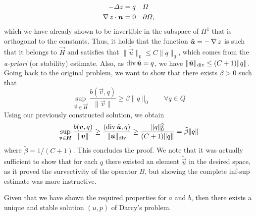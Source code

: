 \begin{itemize}
    \begin{equation}
        \begin{aligned}
            - \Delta z &= q && \Omega \\
            \grad z\cdot \vec n &= 0 &&\partial\Omega,
        \end{aligned}
    \end{equation}
    which we have already shown to be invertible in the subspace of $H^1$ that is orthogonal to the constants. Thus, it holds that the function $\tilde{\vec u} = -\grad z$ is such that it belongs to $\vec H$ and satisfies that $\|\tilde{\vec u}\|_0 \leq C \| q\|_0$, which comes from the \emph{a-priori} (or stability) estimate. Also, as $\dive \tilde{\vec u} = q$, we have $\|\tilde{\vec u}\|_{\dive} \leq (C+1)\|q\|$. Going back to the original problem, we want to show that there exists $\beta>0$ such that
    \begin{equation}
        \sup_{\vec v\in \vec H}\frac{b(\vec v, q)}{\|\vec v\|} \geq \beta \|q\|_0 \qquad \forall q \in Q
    \end{equation}
    Using our previously constructed solution, we obtain
    \begin{equation}
        \sup_{\vec v\in \vec H}\frac{b(\vec v, q)}{\|\vec v\|} \geq \frac{(\dive \tilde{\vec u}, q)}{\|\tilde{\vec u}\|_{\dive}}\geq \frac{\|q\|_0^2}{(C+1)\|q\|} = \tilde\beta \|q\|
    \end{equation}
    where $\tilde \beta = 1/(C+1)$. This concludes the proof. We note that it was actually sufficient to show that for each $q$ there existed an element $\tilde{\vec u}$ in the desired space, as it proved the survectivity of the operator $B$, but showing the complete inf-sup estimate was more instructive. 
\end{itemize}
Given that we have shown the required properties for $a$ and $b$, then there exists a unique and stable solution $(u,p)$ of Darcy's problem.
